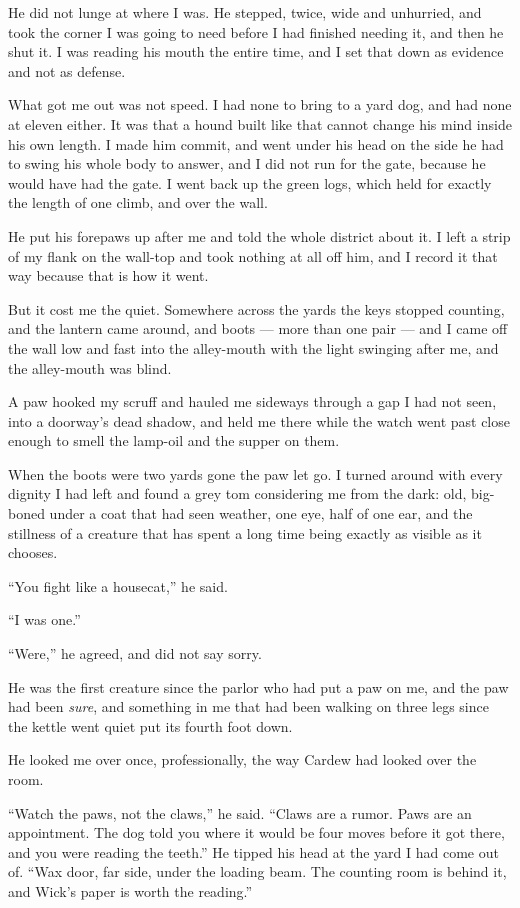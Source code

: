 He did not lunge at where I was. He stepped, twice, wide and unhurried, and took the corner I was going to need before I had finished needing it, and then he shut it. I was reading his mouth the entire time, and I set that down as evidence and not as defense.

What got me out was not speed. I had none to bring to a yard dog, and had none at eleven either. It was that a hound built like that cannot change his mind inside his own length. I made him commit, and went under his head on the side he had to swing his whole body to answer, and I did not run for the gate, because he would have had the gate. I went back up the green logs, which held for exactly the length of one climb, and over the wall.

He put his forepaws up after me and told the whole district about it. I left a strip of my flank on the wall-top and took nothing at all off him, and I record it that way because that is how it went.

But it cost me the quiet. Somewhere across the yards the keys stopped counting, and the lantern came around, and boots --- more than one pair --- and I came off the wall low and fast into the alley-mouth with the light swinging after me, and the alley-mouth was blind.

A paw hooked my scruff and hauled me sideways through a gap I had not seen, into a doorway's dead shadow, and held me there while the watch went past close enough to smell the lamp-oil and the supper on them.

When the boots were two yards gone the paw let go. I turned around with every dignity I had left and found a grey tom considering me from the dark: old, big-boned under a coat that had seen weather, one eye, half of one ear, and the stillness of a creature that has spent a long time being exactly as visible as it chooses.

``You fight like a housecat,'' he said.

``I was one.''

``Were,'' he agreed, and did not say sorry.

He was the first creature since the parlor who had put a paw on me, and the paw had been \emph{sure}, and something in me that had been walking on three legs since the kettle went quiet put its fourth foot down.

He looked me over once, professionally, the way Cardew had looked over the room.

``Watch the paws, not the claws,'' he said. ``Claws are a rumor. Paws are an appointment. The dog told you where it would be four moves before it got there, and you were reading the teeth.'' He tipped his head at the yard I had come out of. ``Wax door, far side, under the loading beam. The counting room is behind it, and Wick's paper is worth the reading.''

